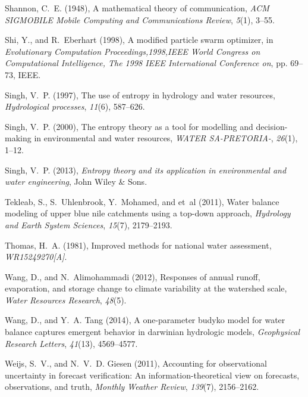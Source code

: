 \documentclass[draft,wrr]{AGUTeX}
\begin{document}
\begin{article}
\begin{thebibliography}{59}
Shannon, C.~E. (1948), A mathematical theory of communication, \textit{ACM
  SIGMOBILE Mobile Computing and Communications Review}, \textit{5}(1), 3--55.

Shi, Y., and R.~Eberhart (1998), A modified particle swarm optimizer, in
  \textit{Evolutionary Computation Proceedings,1998,IEEE World Congress on
  Computational Intelligence, The 1998 IEEE International Conference on}, pp.
  69--73, IEEE.

Singh, V.~P. (1997), The use of entropy in hydrology and water resources,
  \textit{Hydrological processes}, \textit{11}(6), 587--626.

Singh, V.~P. (2000), The entropy theory as a tool for modelling and
  decision-making in environmental and water resources, \textit{WATER
  SA-PRETORIA-}, \textit{26}(1), 1--12.

Singh, V.~P. (2013), \textit{Entropy theory and its application in
  environmental and water engineering}, John Wiley \& Sons.

Tekleab, S., S.~Uhlenbrook, Y.~Mohamed, and et~al (2011), Water balance
  modeling of upper blue nile catchments using a top-down approach,
  \textit{Hydrology and Earth System Sciences}, \textit{15}(7), 2179--2193.

Thomas, H.~A. (1981), Improved methods for national water assessment,
  \textit{WR15249270[A]}.

Wang, D., and N.~Alimohammadi (2012), Responses of annual runoff, evaporation,
  and storage change to climate variability at the watershed scale,
  \textit{Water Resources Research}, \textit{48}(5).

Wang, D., and Y.~A. Tang (2014), A one-parameter budyko model for water balance
  captures emergent behavior in darwinian hydrologic models,
  \textit{Geophysical Research Letters}, \textit{41}(13), 4569--4577.

Weijs, S.~V., and N.~V.~D. Giesen (2011), Accounting for observational
  uncertainty in forecast verification: An information-theoretical view on
  forecasts, observations, and truth, \textit{Monthly Weather Review},
  \textit{139}(7), 2156--2162.


\end{thebibliography}
\end{article}
\end{document}
